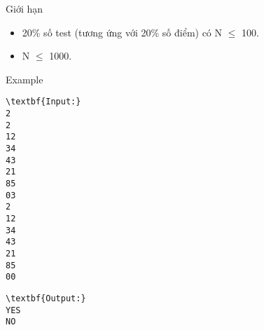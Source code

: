 Giới hạn
\begin{itemize}
	\item 20\% số test (tương ứng với 20\% số điểm) có N  $\le$  100.
	\item N  $\le$  1000.
\end{itemize}
Example
\begin{verbatim}
\textbf{Input:}
2
2
12
34
43
21
85
03
2
12
34
43
21
85
00\end{verbatim}
\begin{verbatim}
\textbf{Output:}
YES
NO\end{verbatim}